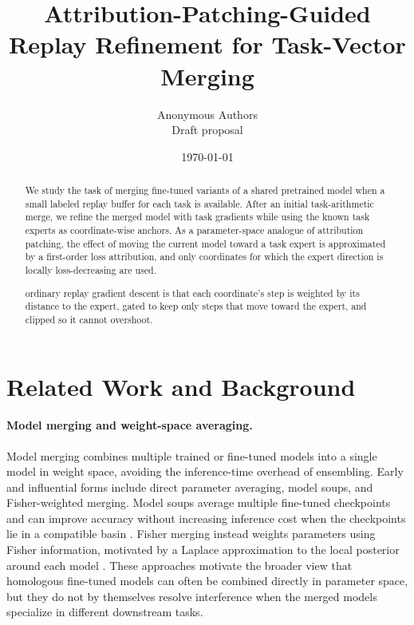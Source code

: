\documentclass[11pt]{article}
\title{Attribution-Patching-Guided Replay Refinement for Task-Vector Merging}
\author{Anonymous Authors \\
\small Draft proposal}
\date{\today}
\begin{document}
\maketitle

\begin{abstract}
We study the task of merging fine-tuned variants of a shared pretrained model when a small labeled replay buffer for each task is available.
After an initial task-arithmetic merge, we refine the merged model with task gradients while using the known task experts as coordinate-wise anchors.
As a parameter-space analogue of attribution patching, the effect of moving the current model toward a task expert is approximated by a first-order loss attribution, and only coordinates for which the expert direction is locally loss-decreasing are used. 

ordinary replay gradient descent is that each coordinate's step is weighted by its distance to the expert, gated to keep only steps that move toward the expert, and clipped so it cannot overshoot.
\end{abstract}

\section{Related Work and Background}

\paragraph{Model merging and weight-space averaging.}
Model merging combines multiple trained or fine-tuned models into a single model in weight space, avoiding the inference-time overhead of ensembling. Early and influential forms include direct parameter averaging, model soups, and Fisher-weighted merging. Model soups average multiple fine-tuned checkpoints and can improve accuracy without increasing inference cost when the checkpoints lie in a compatible basin \citep{wortsman2022modelsoups}. Fisher merging instead weights parameters using Fisher information, motivated by a Laplace approximation to the local posterior around each model \citep{matena2022fisher}. These approaches motivate the broader view that homologous fine-tuned models can often be combined directly in parameter space, but they do not by themselves resolve interference when the merged models specialize in different downstream tasks.
\end{document}
